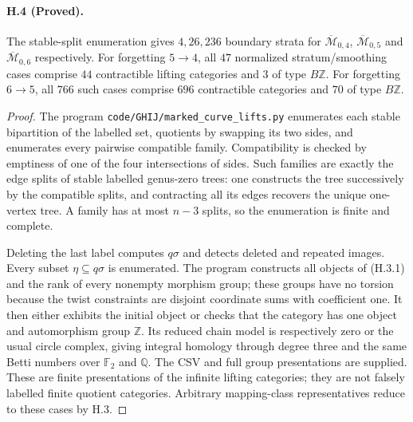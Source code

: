 \paragraph{H.4 (Proved).}
The stable-split enumeration gives $4,26,236$ boundary strata for
$\overline{\mathcal M}_{0,4}$, $\overline{\mathcal M}_{0,5}$ and
$\overline{\mathcal M}_{0,6}$ respectively. For forgetting
$5\to4$, all $47$ normalized stratum/smoothing cases comprise
$44$ contractible lifting categories and $3$ of type $B\mathbb Z$.
For forgetting $6\to5$, all $766$ such cases comprise $696$
contractible categories and $70$ of type $B\mathbb Z$.
\begin{proof}
The program \texttt{code/GHIJ/marked\_curve\_lifts.py} enumerates
each stable bipartition of the labelled set, quotients by swapping
its two sides, and enumerates every pairwise compatible family.
Compatibility is checked by emptiness of one of the four
intersections of sides. Such families are exactly the edge splits
of stable labelled genus-zero trees: one constructs the tree
successively by the compatible splits, and contracting all its
edges recovers the unique one-vertex tree. A family has at most
$n-3$ splits, so the enumeration is finite and complete.

Deleting the last label computes $q\sigma$ and detects deleted
and repeated images. Every subset $\eta\subseteq q\sigma$ is
enumerated. The program constructs all objects of (H.3.1) and
the rank of every nonempty morphism group; these groups have
no torsion because the twist constraints are disjoint coordinate
sums with coefficient one. It then either exhibits the initial
object or checks that the category has one object and automorphism
group $\mathbb Z$. Its reduced chain model is respectively zero
or the usual circle complex, giving integral homology through
degree three and the same Betti numbers over $\mathbb F_2$ and
$\mathbb Q$. The CSV and full group presentations are supplied.
These are finite presentations of the infinite lifting categories;
they are not falsely labelled finite quotient categories. Arbitrary
mapping-class representatives reduce to these cases by H.3.
\end{proof}

